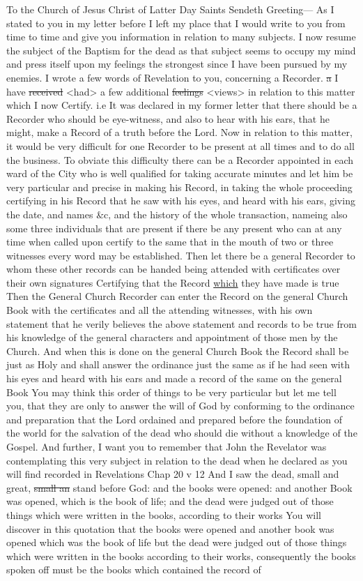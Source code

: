 				To the Church of Jesus Christ of Latter Day Saints Sendeth Greeting--- As I stated to you in my letter before I left my place that I would write to you from time to time and give you information in relation to many subjects. I now resume the subject of the Baptism for the dead as that subject seems to occupy my mind and press itself upon my feelings the strongest since I have been pursued by my enemies. I wrote a few words of Revelation to you, concerning a Recorder. \sout{a} I have \sout{received} <had> a few additional \sout{feelings} <views> in relation to this matter which I now Certify. i.e It was declared in my former letter that there should be a Recorder who should be eye-witness, and also to hear with his ears, that he might, make a Record of a truth before the Lord. Now in relation to this matter, it would be very difficult for one Recorder to be present at all times and to do all the business. To obviate this difficulty there can be a Recorder appointed in each ward of the City who is well qualified for taking accurate minutes and let him be very particular and precise in making his Record, in taking the whole proceeding certifying in his Record that he saw with his eyes, and heard with his ears, giving the date, and names \&c, and the history of the whole transaction, nameing also some three individuals that are present if there be any present who can at any time when called upon certify to the same that in the mouth of two or three witnesses every word may be established. Then let there be a general Recorder to whom these other records can be handed being attended with certificates over their own signatures Certifying that the Record \uline{which} they have made is true Then the General Church Recorder can enter the Record on the general Church Book with the certificates and all the attending witnesses, with his own statement that he verily believes the above statement and records to be true from his knowledge of the general characters and appointment of those men by the Church. And when this is done on the general Church Book the Record shall be just as Holy and shall answer the ordinance just the same as if he had seen with his eyes and heard with his ears and made a record of the same on the general Book You may think this order of things to be very particular but let me tell you, that they are only to answer the will of God by conforming to the ordinance and preparation that the Lord ordained and prepared before the foundation of the world for the salvation of the dead who should die without a knowledge of the Gospel. And further, I want you to remember that John the Revelator was contemplating this very subject in relation to the dead when he declared as you will find recorded in Revelations Chap 20 v 12 And I saw the dead, small and great, \sout{small an} stand before God: and the books were opened: and another Book was opened, which is the book of life; and the dead were judged out of those things which were written in the books, according to their works You will discover in this quotation that the books were opened and another book was opened which was the book of life but the dead were judged out of those things which were written in the books according to their works, consequently the books spoken off must be the books which contained the record of 